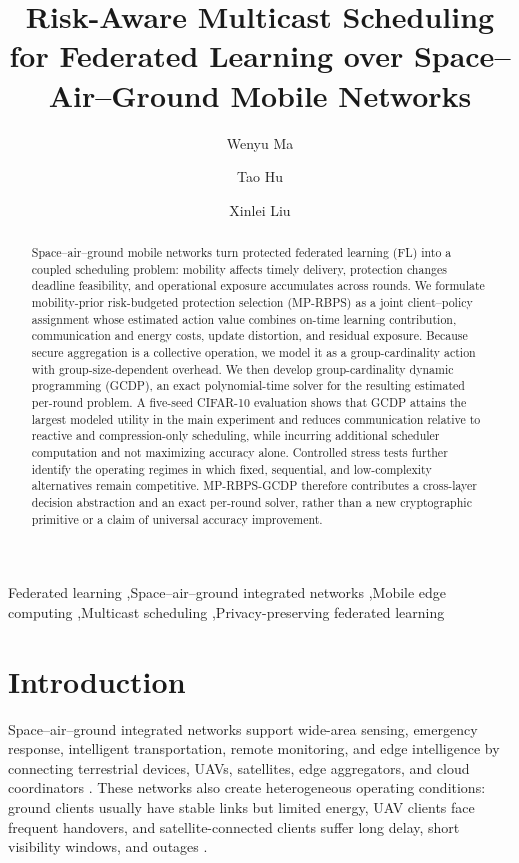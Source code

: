 \documentclass[preprint,12pt]{elsarticle}
\title{Risk-Aware Multicast Scheduling for Federated Learning over Space--Air--Ground Mobile Networks}
\author[inst1,inst2,inst3]{Wenyu Ma}
\author[inst1,inst2,inst3]{Tao Hu\corref{cor1}}
\author[inst1,inst2,inst3]{Xinlei Liu}
\begin{document}
\begin{frontmatter}
\begin{abstract}
	Space--air--ground mobile networks turn protected federated learning (FL) into a coupled scheduling problem: mobility affects timely delivery, protection changes deadline feasibility, and operational exposure accumulates across rounds. We formulate mobility-prior risk-budgeted protection selection (MP-RBPS) as a joint client--policy assignment whose estimated action value combines on-time learning contribution, communication and energy costs, update distortion, and residual exposure. Because secure aggregation is a collective operation, we model it as a group-cardinality action with group-size-dependent overhead. We then develop group-cardinality dynamic programming (GCDP), an exact polynomial-time solver for the resulting estimated per-round problem. A five-seed CIFAR-10 evaluation shows that GCDP attains the largest modeled utility in the main experiment and reduces communication relative to reactive and compression-only scheduling, while incurring additional scheduler computation and not maximizing accuracy alone. Controlled stress tests further identify the operating regimes in which fixed, sequential, and low-complexity alternatives remain competitive. MP-RBPS-GCDP therefore contributes a cross-layer decision abstraction and an exact per-round solver, rather than a new cryptographic primitive or a claim of universal accuracy improvement.
\end{abstract}


\begin{keyword}
Federated learning \sep Space--air--ground integrated networks \sep Mobile edge computing \sep Multicast scheduling \sep Privacy-preserving federated learning
\end{keyword}

\end{frontmatter}


\section{Introduction}

Space--air--ground integrated networks support wide-area sensing, emergency response, intelligent transportation, remote monitoring, and edge intelligence by connecting terrestrial devices, UAVs, satellites, edge aggregators, and cloud coordinators \cite{liu2018sagin,mahboob2024ntn,tang2023flsagin}. These networks also create heterogeneous operating conditions: ground clients usually have stable links but limited energy, UAV clients face frequent handovers, and satellite-connected clients suffer long delay, short visibility windows, and outages \cite{mahboob2024ntn,razmi2022ground,qin2024dfrl}.
\end{document}
